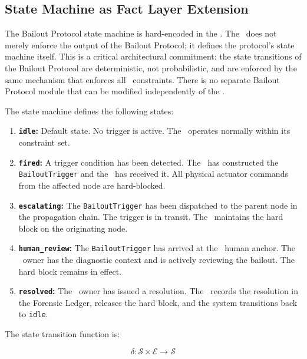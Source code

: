 \subsection{State Machine as Fact Layer Extension}
\label{sec:state-machine}

The Bailout Protocol state machine is hard-encoded in the \fact. The \fact\ does not merely enforce the output of the Bailout Protocol; it defines the protocol's state machine itself. This is a critical architectural commitment: the state transitions of the Bailout Protocol are deterministic, not probabilistic, and are enforced by the same mechanism that enforces all \fact\ constraints. There is no separate Bailout Protocol module that can be modified independently of the \fact.

The state machine defines the following states:

\begin{enumerate}
\item \textbf{\texttt{idle}:} Default state. No trigger is active. The \bounds\ operates normally within its constraint set.

\item \textbf{\texttt{fired}:} A trigger condition has been detected. The \bounds\ has constructed the \texttt{BailoutTrigger} and the \fact\ has received it. All physical actuator commands from the affected node are hard-blocked.

\item \textbf{\texttt{escalating}:} The \texttt{BailoutTrigger} has been dispatched to the parent node in the propagation chain. The trigger is in transit. The \fact\ maintains the hard block on the originating node.

\item \textbf{\texttt{human\_review}:} The \texttt{BailoutTrigger} has arrived at the \purpose\ human anchor. The \purpose\ owner has the diagnostic context and is actively reviewing the bailout. The hard block remains in effect.

\item \textbf{\texttt{resolved}:} The \purpose\ owner has issued a resolution. The \fact\ records the resolution in the Forensic Ledger, releases the hard block, and the system transitions back to \texttt{idle}.
\end{enumerate}

The state transition function is:

\begin{equation}
\delta: \mathcal{S} \times \mathcal{E} \rightarrow \mathcal{S}
\end{equation}

